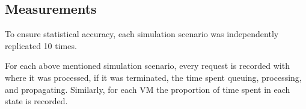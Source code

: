 \subsection{Measurements}
To ensure statistical accuracy, each simulation scenario was independently replicated 10 times.

For each above mentioned simulation scenario, every request is recorded with where it was processed, if it was terminated, the time spent queuing, processing, and propagating. Similarly, for each VM the proportion of time spent in each state is recorded.